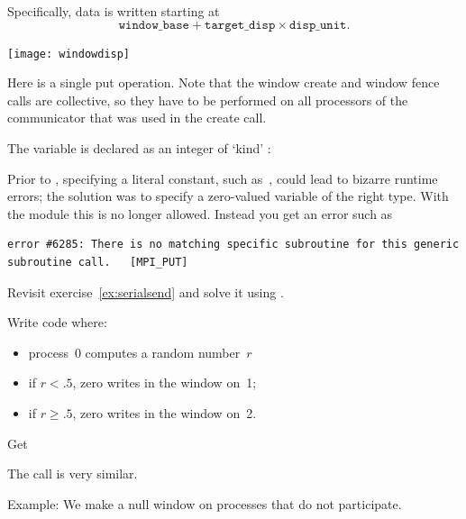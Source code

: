 Specifically, data is written starting at
\[ \mathtt{window\_base} + \mathtt{target\_disp}\times \mathtt{disp\_unit}. \]

\texttt{[image: windowdisp]}

Here is a single put operation. Note that the window create and window fence calls
are collective, so they have to be performed on all processors
of the communicator that was used in the create call.
%

\begin{fortrannote}
  The  variable is declared as an integer of `kind'
  :

Prior to ,
specifying a literal constant, such as~, could lead to bizarre
runtime errors; the solution was to specify a zero-valued variable
of the right type.
With the  module this
is no longer allowed. Instead you get an error such as
\begin{verbatim}
error #6285: There is no matching specific subroutine for this generic subroutine call.   [MPI_PUT]
\end{verbatim}
\end{fortrannote}

\begin{exercise}
  \label{ex:rightput}
  Revisit exercise~\ref{ex:serialsend} and solve it using
  .
\end{exercise}

\begin{exercise}
  \label{ex:randomput}
  Write code where:
  \begin{itemize}
  \item
    process~0 computes a random number~$r$
  \item if $r<.5$, zero writes in the window on~1;
  \item if $r\geq .5$, zero writes in the window on~2.
  \end{itemize}

\end{exercise}

 {Get}

The  call is very similar.

Example:
%
%
We make a null window on processes that do not participate.
%

